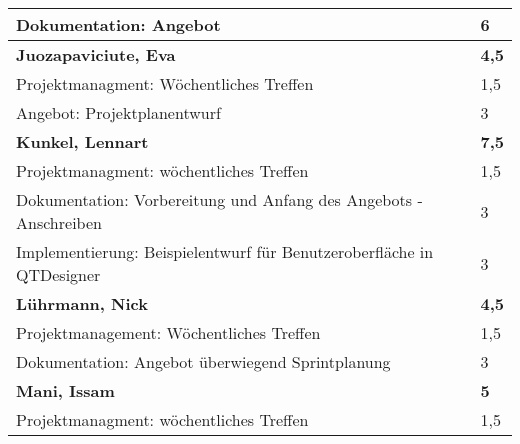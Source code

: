 \documentclass[a4paper,11pt]{scrartcl}
\begin{document}
\begin{longtable}{| p{13.8cm} | C{2.4cm} |}
	Dokumentation: Angebot
	&
	6
	\\
	\hline
	\hline


	\textbf{Juozapaviciute, Eva} & \textbf{4,5}\\ %
	\hline

  Projektmanagment: Wöchentliches Treffen
	&
  1,5
	\\
	\hline

  Angebot: Projektplanentwurf
	&
  3
	\\
	\hline
	\hline


	\textbf{Kunkel, Lennart} & \textbf{7,5}\\ %
	\hline

  Projektmanagment: wöchentliches Treffen
	&
  1,5
	\\
	\hline

  Dokumentation: Vorbereitung und Anfang des Angebots - Anschreiben
	&
  3
	\\
	\hline

  Implementierung: Beispielentwurf für Benutzeroberfläche in QTDesigner
	&
  3
	\\
	\hline
	\hline


	\textbf{Lührmann, Nick} & \textbf{4,5}\\ %
	\hline

	Projektmanagement: Wöchentliches Treffen
	&
	1,5
	\\
	\hline

	Dokumentation: Angebot überwiegend Sprintplanung
	&
  3
	\\
	\hline
	\hline


	\textbf{Mani, Issam} & \textbf{5}\\ %
	\hline

  Projektmanagment: wöchentliches Treffen
	&
  1,5
	\\
	\hline


\end{longtable}
\end{document}

